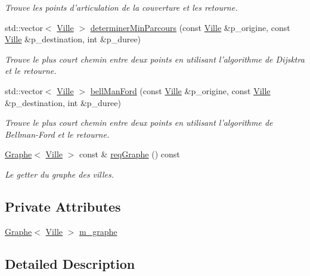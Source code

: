 \begin{DoxyCompactItemize}
\begin{DoxyCompactList}\small\item\em Trouve les points d'articulation de la couverture et les retourne. \end{DoxyCompactList}\item 
std::vector$<$ \hyperlink{classtp2_1_1_ville}{Ville} $>$ \hyperlink{classtp2_1_1_couverture_ae02fdb4ef4c726327740e8343ba8b5fa}{determinerMinParcours} (const \hyperlink{classtp2_1_1_ville}{Ville} \&p\_\-origine, const \hyperlink{classtp2_1_1_ville}{Ville} \&p\_\-destination, int \&p\_\-duree)
\begin{DoxyCompactList}\small\item\em Trouve le plus court chemin entre deux points en utilisant l'algorithme de Dijsktra et le retourne. \end{DoxyCompactList}\item 
std::vector$<$ \hyperlink{classtp2_1_1_ville}{Ville} $>$ \hyperlink{classtp2_1_1_couverture_ad5d03d00aac730bc9694d7714189b47e}{bellManFord} (const \hyperlink{classtp2_1_1_ville}{Ville} \&p\_\-origine, const \hyperlink{classtp2_1_1_ville}{Ville} \&p\_\-destination, int \&p\_\-duree)
\begin{DoxyCompactList}\small\item\em Trouve le plus court chemin entre deux points en utilisant l'algorithme de Bellman-\/Ford et le retourne. \end{DoxyCompactList}\item 
\hyperlink{class_graphe}{Graphe}$<$ \hyperlink{classtp2_1_1_ville}{Ville} $>$ const \& \hyperlink{classtp2_1_1_couverture_adcfd305e117e692f5531e0a16028a5d9}{reqGraphe} () const 
\begin{DoxyCompactList}\small\item\em Le getter du graphe des villes. \end{DoxyCompactList}\end{DoxyCompactItemize}
\subsection*{Private Attributes}
\begin{DoxyCompactItemize}
\item 
\hyperlink{class_graphe}{Graphe}$<$ \hyperlink{classtp2_1_1_ville}{Ville} $>$ \hyperlink{classtp2_1_1_couverture_a6a620a08b2a810862999c0059c87408e}{m\_\-graphe}
\end{DoxyCompactItemize}


\subsection{Detailed Description}


